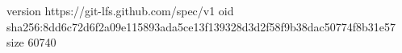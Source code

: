 version https://git-lfs.github.com/spec/v1
oid sha256:8dd6c72d6f2a09e115893ada5ce13f139328d3d2f58f9b38dac50774f8b31e57
size 60740
